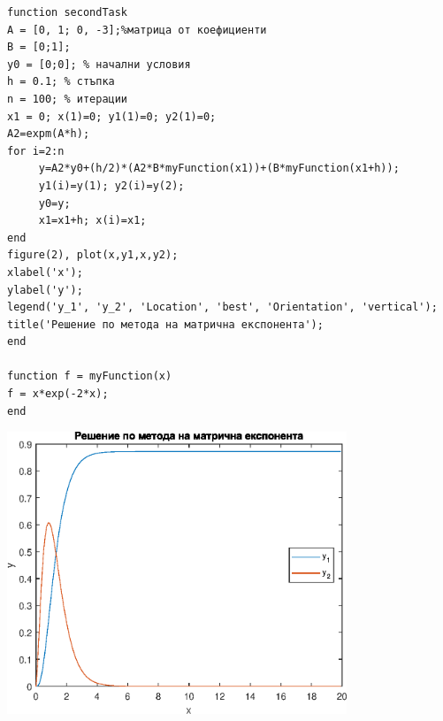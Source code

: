 \documentclass[a4paper,fleqn,12pt]{article}
\begin{document}
\newpage
\begin{verbatim}
function secondTask
A = [0, 1; 0, -3];%матрица от коефициенти
B = [0;1];
y0 = [0;0]; % начални условия
h = 0.1; % стъпка
n = 100; % итерации
x1 = 0; x(1)=0; y1(1)=0; y2(1)=0;
A2=expm(A*h);
for i=2:n
     y=A2*y0+(h/2)*(A2*B*myFunction(x1))+(B*myFunction(x1+h));
     y1(i)=y(1); y2(i)=y(2);
     y0=y;
     x1=x1+h; x(i)=x1;
end
figure(2), plot(x,y1,x,y2);
xlabel('x');
ylabel('y');
legend('y_1', 'y_2', 'Location', 'best', 'Orientation', 'vertical');
title('Решение по метода на матрична експонента');
end

function f = myFunction(x)
f = x*exp(-2*x);
end
\end{verbatim}
\begin{center}
\includegraphics[width=4in]{secondTask_01.eps}
\end{center}

\newpage
\end{document}
